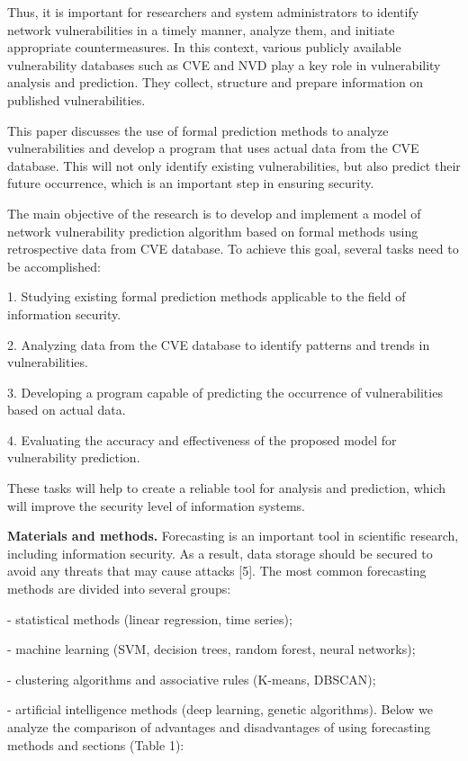 Thus, it is important for researchers and system administrators to
identify network vulnerabilities in a timely manner, analyze them, and
initiate appropriate countermeasures. In this context, various publicly
available vulnerability databases such as CVE and NVD play a key role in
vulnerability analysis and prediction. They collect, structure and
prepare information on published vulnerabilities.

This paper discusses the use of formal prediction methods to analyze
vulnerabilities and develop a program that uses actual data from the CVE
database. This will not only identify existing vulnerabilities, but also
predict their future occurrence, which is an important step in ensuring
security.

The main objective of the research is to develop and implement a model
of network vulnerability prediction algorithm based on formal methods
using retrospective data from CVE database. To achieve this goal,
several tasks need to be accomplished:

1. Studying existing formal prediction methods applicable to the field
of information security.

2. Analyzing data from the CVE database to identify patterns and trends
in vulnerabilities.

3. Developing a program capable of predicting the occurrence of
vulnerabilities based on actual data.

4. Evaluating the accuracy and effectiveness of the proposed model for
vulnerability prediction.

These tasks will help to create a reliable tool for analysis and
prediction, which will improve the security level of information
systems.

{\bfseries Materials and methods.} Forecasting is an important tool in
scientific research, including information security. As a result, data
storage should be secured to avoid any threats that may cause attacks
{[}5{]}. The most common forecasting methods are divided into several
groups:


- statistical methods (linear regression, time series);

- machine learning (SVM, decision trees, random forest, neural
networks);

- clustering algorithms and associative rules (K-means, DBSCAN);

- artificial intelligence methods (deep learning, genetic algorithms).
Below we analyze the comparison of advantages and disadvantages of using
forecasting methods and sections (Table 1):

